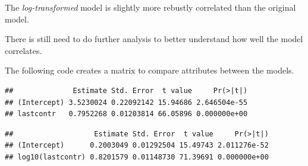 \documentclass[
]{article}
\newenvironment{Shaded}{\begin{snugshade}}{\end{snugshade}}
\newcommand{\CommentTok}[1]{\textcolor[rgb]{0.56,0.35,0.01}{\textit{#1}}}
\newcommand{\NormalTok}[1]{#1}
\newcommand{\SpecialCharTok}[1]{\textcolor[rgb]{0.00,0.00,0.00}{#1}}
\begin{document}
The \emph{log-transformed} model is slightly more rebustly correlated
than the original model.

There is still need to do further analysis to better understand how well
the model correlates.

The following code creates a matrix to compare attributes between the
models.

\begin{Shaded}
\end{Shaded}

\begin{verbatim}
##              Estimate Std. Error  t value     Pr(>|t|)
## (Intercept) 3.5230024 0.22092142 15.94686 2.646504e-55
## lastcontr   0.7952268 0.01203814 66.05896 0.000000e+00
\end{verbatim}

\begin{Shaded}
\end{Shaded}

\begin{verbatim}
##                   Estimate Std. Error  t value     Pr(>|t|)
## (Intercept)      0.2003049 0.01292504 15.49743 2.011276e-52
## log10(lastcontr) 0.8201579 0.01148730 71.39691 0.000000e+00
\end{verbatim}
\end{document}
